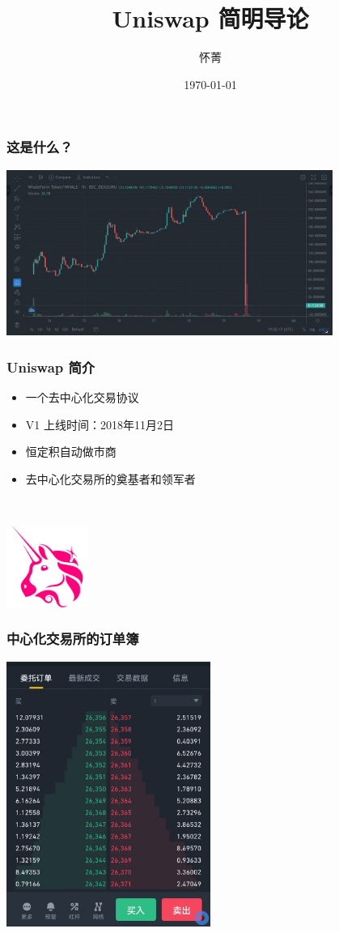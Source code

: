 \documentclass{beamer}
\title{Uniswap 简明导论}
\author{怀菁}
\institute{武汉大学}
\date{\today}
\begin{document}
\frame{\titlepage}

\begin{frame}
    \frametitle{这是什么？}

    \centering
    \includegraphics[width=0.8\textwidth]{../notes/rugpull.jpeg}

\end{frame}

\begin{frame}
    \frametitle{Uniswap 简介}

    \begin{itemize}
        \item 一个去中心化交易协议
        \item V1 上线时间：2018年11月2日
        \item 恒定积自动做市商
        \item 去中心化交易所的奠基者和领军者
    \end{itemize}

    ~

    \centering
    \includegraphics[width=0.2\textwidth]{Uniswap-Logo.png}
\end{frame}

\begin{frame}
    \frametitle{中心化交易所的订单簿}

    \centering
    \includegraphics[width=0.5\textwidth]{../notes/订单簿示意图.jpg}
\end{frame}
\end{document}
